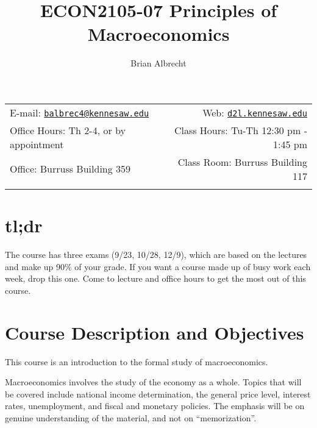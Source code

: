 \documentclass[11pt,]{article}
\title{ECON2105-07 Principles of Macroeconomics}
\author{Brian Albrecht}
\date{}
\begin{document}
  

		\maketitle
		
	
		\thispagestyle{firststyle}



	\noindent \begin{tabular*}{\textwidth}{ @{\extracolsep{\fill}} lr @{\extracolsep{\fill}}}


E-mail: \texttt{\href{mailto:balbrec4@kennesaw.edu}{\nolinkurl{balbrec4@kennesaw.edu}}} & Web: \href{http://d2l.kennesaw.edu}{\tt d2l.kennesaw.edu}\\
Office Hours: Th 2-4, or by appointment  &  Class Hours: Tu-Th 12:30 pm - 1:45 pm\\
Office: Burruss Building 359  & Class Room: Burruss Building 117\\
	&  \\
	\hline
	\end{tabular*}
	
\vspace{2mm}
	


\hypertarget{tldr}{%
\section{tl;dr}\label{tldr}}

The course has three exams (9/23, 10/28, 12/9), which are based on the lectures and make up 90\% of your grade. If you want a course made up of busy work each week, drop this one. Come to lecture and office hours to get the most out of this course.

\hypertarget{course-description-and-objectives}{%
\section*{Course Description and Objectives}\label{course-description-and-objectives}}

This course is an introduction to the formal study of macroeconomics.

Macroeconomics involves the study of the economy as a whole. Topics that will be covered include national
income determination, the general price level, interest rates, unemployment, and fiscal and monetary policies.
The emphasis will be on genuine understanding of the material, and not on ``memorization''.
\end{document}
